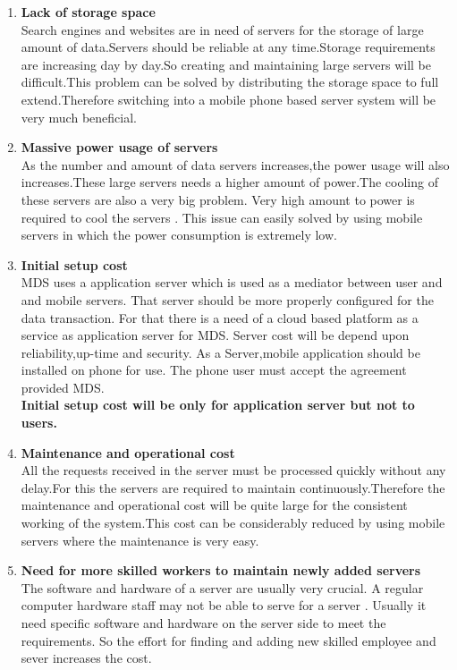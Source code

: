 \documentclass[12pt, a4paper]{article}
\begin{document}
\begin{enumerate}[leftmargin=1.2cm]
\item \textbf{Lack of storage space} \\Search engines and websites are in need of servers for the storage of large amount of data.Servers should be reliable at any time.Storage requirements are increasing day by day.So creating and maintaining large servers will be difficult.This problem can be solved by distributing the storage space to full extend.Therefore switching into a mobile phone based server system will be very much beneficial.
\item \textbf{Massive power usage of servers}\\As the number and amount of data servers increases,the power usage will also increases.These large servers needs a higher amount of power.The cooling of these servers are also a very big problem. Very high amount to power is required to cool the servers .  This issue can easily solved by using mobile servers in which the power consumption is extremely low.
\item \textbf{Initial setup cost}\\MDS uses a application server which is used as a mediator between user and and mobile servers. That server should be more properly configured for the data transaction. For that there is a need of a cloud based platform as a  service as application server for MDS. Server cost will be depend upon reliability,up-time and security. As a Server,mobile application should be installed on phone for use. The phone user must accept the agreement provided MDS.\\
\textbf{Initial setup cost will be only for application server but not to users.}
\item \textbf{Maintenance and operational cost}\\All the requests received in the server must be processed quickly without any delay.For this the servers are required to maintain continuously.Therefore the maintenance and operational cost  will be quite large for the consistent working of the system.This cost can be considerably reduced by using mobile servers where the maintenance is very easy.
\item \textbf{Need for more skilled workers to maintain newly added servers}\\The software and hardware of a server are usually very crucial. A regular computer hardware staff may not be able to serve for a server . Usually it need specific software and hardware on the server side to meet the requirements. So the effort  for finding and adding new skilled employee and sever increases the cost.

\end{enumerate}
\end{document}
